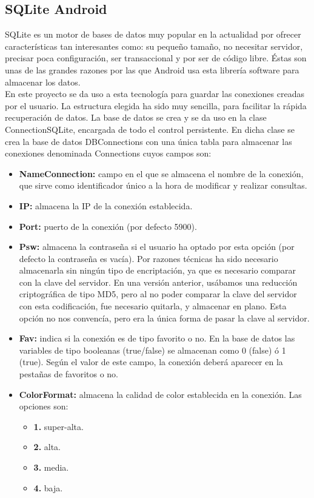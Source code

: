 \subsection{SQLite Android}

SQLite\cite{sql:sql} es un motor de bases de datos muy popular en la actualidad por ofrecer características tan interesantes como: su pequeño tamaño, no necesitar servidor, precisar poca configuración, ser transaccional y por ser de código libre. Éstas son unas de las grandes razones por las que Android usa esta librería software para almacenar los datos. \\

En este proyecto se da uso a esta tecnología para guardar las conexiones creadas por el usuario. La estructura elegida ha sido muy sencilla, para facilitar la rápida recuperación de datos. La base de datos se crea y se da uso en la clase ConnectionSQLite, encargada de todo el control persistente. En dicha clase se crea la base de datos DBConnections con una única tabla para almacenar las conexiones denominada Connections cuyos campos son:
\begin{itemize}

\item \textbf{NameConnection:} campo en el que se almacena el nombre de la conexión, que sirve como identificador único a la hora de modificar y realizar consultas.
\item \textbf{IP:} almacena la IP de la conexión establecida.
\item \textbf{Port:} puerto de la conexión (por defecto 5900).
\item \textbf{Psw:} almacena la contraseña si el usuario ha optado por esta opción (por defecto la contraseña es vacía). Por razones técnicas ha sido necesario almacenarla sin ningún tipo de encriptación, ya que es necesario comparar con la clave del servidor. En una versión anterior, usábamos una reducción criptográfica de tipo MD5, pero al no poder comparar la clave del servidor con esta codificación, fue necesario quitarla, y almacenar en plano. Esta opción no nos convencía, pero era la única forma de pasar la clave al servidor.
\item \textbf{Fav:} indica si la conexión es de tipo favorito o no. En la base de datos las variables de tipo booleanas (true/false) se almacenan como 0 (false) ó 1 (true). Según el valor de este campo, la conexión deberá aparecer en la pestañas de favoritos o no.
\item \textbf{ColorFormat:} almacena la calidad de color establecida en la conexión. Las opciones son:

\begin{itemize}
\item \textbf{1.} super-alta.
\item \textbf{2.} alta.
\item \textbf{3.} media.
\item \textbf{4.} baja.

\end{itemize}

\end{itemize}

